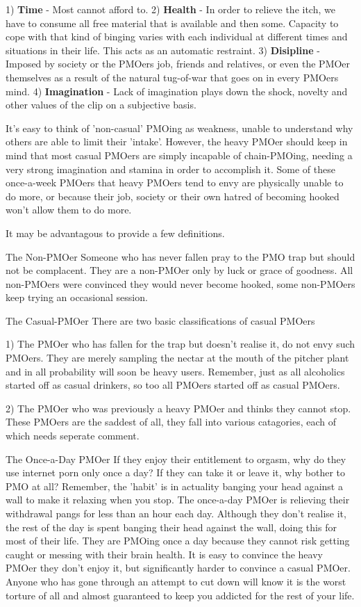   1) \textbf{Time} - Most cannot afford to.
  2) \textbf{Health} - In order to relieve the itch, we have to consume all free material that is available and then some. Capacity to cope with that kind of binging varies with each individual at different times and situations in their life. This acts as an automatic restraint.
  3) \textbf{Disipline} - Imposed by society or the PMOers job, friends and relatives, or even the PMOer themselves as a result of the natural tug-of-war that goes on in every PMOers mind.
  4) \textbf{Imagination} - Lack of imagination plays down the shock, novelty and other values of the clip on a subjective basis.

It's easy to think of 'non-casual' PMOing as weakness, unable to understand why others are able to limit their 'intake'. However, the heavy PMOer should keep in mind that most casual PMOers are simply incapable of chain-PMOing, needing a very strong imagination and stamina in order to accomplish it. Some of these once-a-week PMOers that heavy PMOers tend to envy are physically unable to do more, or because their job, society or their own hatred of becoming hooked won't allow them to do more.

It may be advantagous to provide a few definitions.
  
The Non-PMOer
  Someone who has never fallen pray to the PMO trap but should not be complacent. They are a non-PMOer only by luck or grace of goodness. All non-PMOers were convinced they would never become hooked, some non-PMOers keep trying an occasional session.

The Casual-PMOer
  There are two basic classifications of casual PMOers

  1) The PMOer who has fallen for the trap but doesn't realise it, do not envy such PMOers. They are merely sampling the nectar at the mouth of the pitcher plant and in all probability will soon be heavy users. Remember, just as all alcoholics started off as casual drinkers, so too all PMOers started off as casual PMOers.

  2) The PMOer who was previously a heavy PMOer and thinks they cannot stop. These PMOers are the saddest of all, they fall into various catagories, each of which needs seperate comment.

The Once-a-Day PMOer
  If they enjoy their entitlement to orgasm, why do they use internet porn only once a day? If they can take it or leave it, why bother to PMO at all? Remember, the 'habit' is in actuality banging your head against a wall to make it relaxing when you stop. The once-a-day PMOer is relieving their withdrawal pangs for less than an hour each day. Although they don't realise it, the rest of the day is spent banging their head against the wall, doing this for most of their life. They are PMOing once a day because they cannot risk getting caught or messing with their brain health. It is easy to convince the heavy PMOer they don't enjoy it, but significantly harder to convince a casual PMOer. Anyone who has gone through an attempt to cut down will know it is the worst torture of all and almost guaranteed to keep you addicted for the rest of your life.

